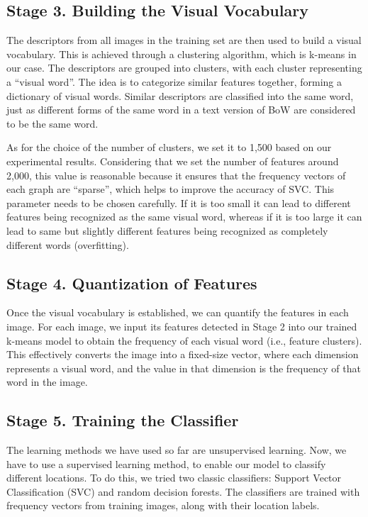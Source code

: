 \documentclass[conference]{IEEEtran}
\begin{document}
\subsection*{Stage 3. Building the Visual Vocabulary}

The descriptors from all images in the training set are then used to build a visual vocabulary. This is achieved through a clustering algorithm, which is k-means in our case. The descriptors are grouped into clusters, with each cluster representing a ``visual word''. The idea is to categorize similar features together, forming a dictionary of visual words. Similar descriptors are classified into the same word, just as different forms of the same word in a text version of BoW are considered to be the same word.

As for the choice of the number of clusters, we set it to 1,500 based on our experimental results. Considering that we set the number of features around 2,000, this value is reasonable because it ensures that the frequency vectors of each graph are ``sparse'', which helps to improve the accuracy of SVC. This parameter needs to be chosen carefully. If it is too small it can lead to different features being recognized as the same visual word, whereas if it is too large it can lead to same but slightly different features being recognized as completely different words (overfitting).

\subsection*{Stage 4. Quantization of Features}

Once the visual vocabulary is established, we can quantify the features in each image. For each image, we input its features detected in Stage 2 into our trained k-means model to obtain the frequency of each visual word (i.e., feature clusters). This effectively converts the image into a fixed-size vector, where each dimension represents a visual word, and the value in that dimension is the frequency of that word in the image.

\subsection*{Stage 5. Training the Classifier}

The learning methods we have used so far are unsupervised learning. Now, we have to use a supervised learning method, to enable our model to classify different locations. To do this, we tried two classic classifiers: Support Vector Classification (SVC) and random decision forests. The classifiers are trained with frequency vectors from training images, along with their location labels.
\end{document}
